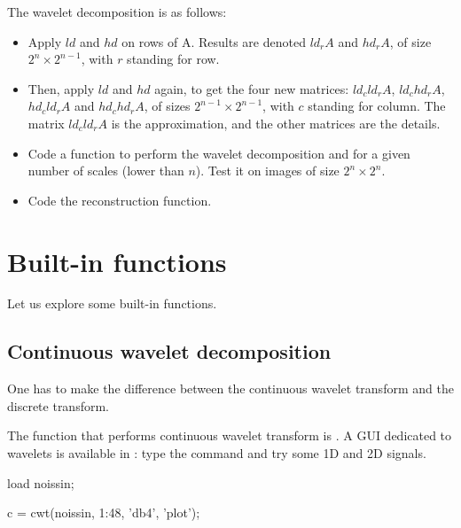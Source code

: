 The wavelet decomposition is as follows:
\begin{itemize}
 \item Apply $ld$ and $hd$ on rows of A. Results are denoted $ld_r A$ and $hd_r A$, of size $2^n\times 2^{n-1}$, with $r$ standing for row.
 \item Then, apply $ld$ and $hd$ again, to get the four new matrices: $ld_c ld_r A$, $ld_c hd_r A$, $hd_c ld_r A$ and $hd_c hd_r A$, of 
sizes $2^{n-1}\times 2^{n-1}$, with $c$ standing for column. The matrix $ld_c ld_r A$ is the approximation, and the other matrices are the 
details.
\end{itemize}

\begin{qbox}
\begin{itemize} \item Code a function to perform the wavelet decomposition and for a given number of scales (lower than $n$). Test 
it on images of size $2^n\times 2^n$.
 \item Code the reconstruction function.
\end{itemize}

\end{qbox}


\section{Built-in functions}
Let us explore some built-in functions. 

\subsection{Continuous wavelet decomposition}
One has to make the difference between the continuous wavelet transform and the discrete transform.

\begin{mcomment}
\begin{mremark}
The \matlabregistered{} function that performs continuous wavelet transform is .
 A GUI dedicated to wavelets is available in \matlabregistered{}: type the command  and try some 1D and 2D signals. 
\begin{matlab}
load noissin; %

c = cwt(noissin, 1:48, 'db4', 'plot');
\end{matlab}
\end{mremark}
\end{mcomment}

